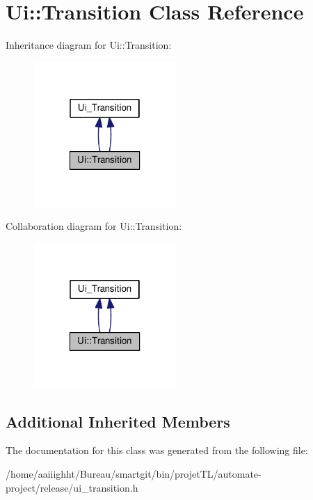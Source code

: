 \hypertarget{class_ui_1_1_transition}{\section{Ui\-:\-:Transition Class Reference}
\label{class_ui_1_1_transition}
}


Inheritance diagram for Ui\-:\-:Transition\-:
\nopagebreak
\begin{figure}[H]
\begin{center}
\leavevmode
\includegraphics[width=154pt]{class_ui_1_1_transition__inherit__graph}
\end{center}
\end{figure}


Collaboration diagram for Ui\-:\-:Transition\-:
\nopagebreak
\begin{figure}[H]
\begin{center}
\leavevmode
\includegraphics[width=154pt]{class_ui_1_1_transition__coll__graph}
\end{center}
\end{figure}
\subsection*{Additional Inherited Members}


The documentation for this class was generated from the following file\-:\begin{DoxyCompactItemize}
\item 
/home/aaiiighht/\-Bureau/smartgit/bin/projet\-T\-L/automate-\/project/release/ui\-\_\-transition.\-h\end{DoxyCompactItemize}
